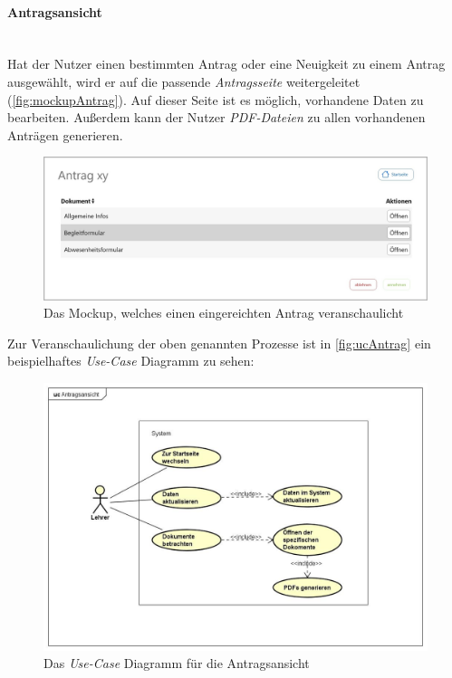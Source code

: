 \paragraph{Antragsansicht}
~\\
Hat der Nutzer einen bestimmten Antrag oder eine Neuigkeit zu einem Antrag ausgewählt, wird er auf die passende \textit{Antragsseite} weitergeleitet (\autoref{fig:mockupAntrag}). Auf dieser Seite ist es möglich, vorhandene Daten zu bearbeiten. Außerdem kann der Nutzer \textit{PDF-Dateien} zu allen vorhandenen Anträgen generieren.
\begin{figure}[H]
	\centering
	\includegraphics[width=1\linewidth]{images/ldehner_konzept/Mockup-Antragsansicht}
	\caption[Mockup Antragsansicht]{Das Mockup, welches einen eingereichten Antrag veranschaulicht}
	\label{fig:mockupAntrag}
\end{figure}
Zur Veranschaulichung der oben genannten Prozesse ist in \autoref{fig:ucAntrag} ein beispielhaftes \textit{Use-Case} Diagramm zu sehen: 
\begin{figure}[H]
	\centering
	\includegraphics[width=1\linewidth]{images/ldehner_konzept/uc-antrag}
	\caption[\textit{Use-Case} Diagramm Antragsansicht]{Das \textit{Use-Case} Diagramm für die Antragsansicht}
	\label{fig:ucAntrag}
\end{figure}